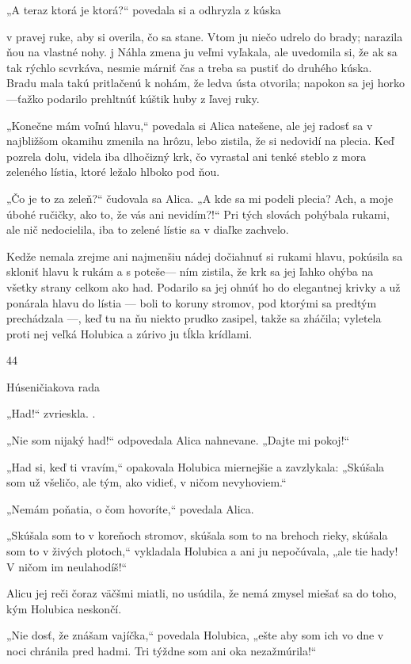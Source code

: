 \documentclass[12pt]{book}
\begin{document}
\begin{Parallel}[p]{}{}
{„A teraz ktorá je ktorá?“ povedala si a odhryzla z kúska

v pravej ruke, aby si overila, čo sa stane. Vtom ju niečo
udrelo do brady; narazila ňou na vlastné nohy.
j Náhla zmena ju veľmi vyľakala, ale uvedomila si, že ak sa
tak rýchlo scvrkáva, nesmie márniť čas a treba sa pustiť do
druhého kúska. Bradu mala takú pritlačenú k nohám, že
ledva ústa otvorila; napokon sa jej horko—ťažko podarilo
prehltnúť kúštik huby z ľavej ruky.

„Konečne mám voľnú hlavu,“ povedala si Alica natešene,
ale jej radosť sa v najbližšom okamihu zmenila na hrôzu,
lebo zistila, že si nedovidí na plecia. Keď pozrela dolu, videla
iba dlhočizný krk, čo vyrastal ani tenké steblo z mora
zeleného lístia, ktoré ležalo hlboko pod ňou.

„Čo je to za zeleň?“ čudovala sa Alica. „A kde sa mi
podeli plecia? Ach, a moje úbohé ručičky, ako to, že vás ani
nevidím?!“ Pri tých slovách pohýbala rukami, ale nič
nedocielila, iba to zelené lístie sa v diaľke zachvelo.

Kedže nemala zrejme ani najmenšiu nádej dočiahnuť si
rukami hlavu, pokúsila sa skloniť hlavu k rukám a s poteše—
ním zistila, že krk sa jej ľahko ohýba na všetky strany celkom
ako had. Podarilo sa jej ohnúť ho do elegantnej krivky a už
ponárala hlavu do lístia — boli to koruny stromov, pod
ktorými sa predtým prechádzala —, keď tu na ňu niekto
prudko zasipel, takže sa zháčila; vyletela proti nej veľká
Holubica a zúrivo ju tĺkla krídlami. \

44

Húseničiakova rada

„Had!“ zvrieskla. .

„Nie som nijaký had!“ odpovedala Alica nahnevane.
„Dajte mi pokoj!“

„Had si, keď ti vravím,“ opakovala Holubica miernejšie
a zavzlykala: „Skúšala som už všeličo, ale tým, ako vidieť,
v ničom nevyhoviem.“

„Nemám poňatia, o čom hovoríte,“ povedala Alica.

„Skúšala som to v koreňoch stromov, skúšala som to na
brehoch rieky, skúšala som to v živých plotoch,“ vykladala
Holubica a ani ju nepočúvala, „ale tie hady! V ničom im
neulahodíš!“

Alicu jej reči čoraz väčšmi miatli, no usúdila, že nemá
zmysel miešať sa do toho, kým Holubica neskončí.

„Nie dosť, že znášam vajíčka,“ povedala Holubica, „ešte
aby som ich vo dne v noci chránila pred hadmi. Tri týždne
som ani oka nezažmúrila!“

}
\end{Parallel}
\end{document}
